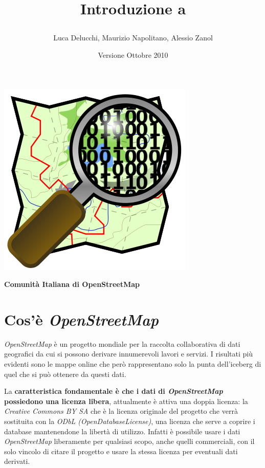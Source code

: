 \documentclass[a4paper,twoside,12pt,]{article}
\title{\begin{Large}Introduzione a \osm\end{Large}}
\date{\small{Versione Ottobre 2010}}
\author{Luca Delucchi, Maurizio Napolitano, Alessio Zanol}
\newcommand{\osm}{\emph{OpenStreetMap}\xspace}
\newcommand{\pro}[1]{\emph{#1}}
\begin{document}
\maketitle
\begin{center}
\includegraphics{Openstreetmap.png}
\end{center}
\begin{center}
	\begin{large}
	\textbf{Comunità Italiana di OpenStreetMap}
	\end{large}
\end{center}
\newpage

\section{Cos'è \osm}
\osm è un progetto mondiale per la raccolta collaborativa di dati geografici da cui si possono derivare innumerevoli lavori e servizi. I risultati più evidenti sono le mappe online che però rappresentano solo la punta dell'iceberg di quel che si può ottenere da questi dati.

La \textbf{caratteristica fondamentale è che i dati di \osm possiedono una licenza libera}, attualmente è attiva una doppia licenza: la \pro{Creative Commons BY SA} che è la licenza originale del progetto che verrà sostituita con la \pro{ODbL (OpenDatabaseLicense)}, una licenza che serve a coprire i database mantenendone la libertà di utilizzo. Infatti è possibile usare i dati \osm liberamente per qualsiasi scopo, anche quelli commerciali, con il solo vincolo di citare il progetto e usare la stessa licenza per eventuali dati derivati. 
\end{document}
